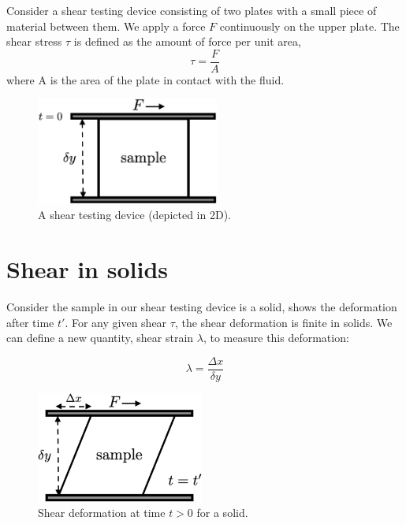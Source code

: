 Consider a shear testing device consisting of two plates with a small piece of material between them. We apply a force $F$ continuously on the upper plate. The shear stress $\tau$ is defined as the amount of force per unit area,
\begin{equation}
  \tau = \frac{F}{A}
\end{equation}
where A is the area of the plate in contact with the fluid.

\begin{figure}[h] \label{fig:shear-testing}
  \centering
  \includegraphics[width=6cm]{fig/shear-testing.png}
  \caption{A shear testing device (depicted in 2D).}
\end{figure}


\section{Shear in solids}

Consider the sample in our shear testing device is a solid,  shows the deformation after time $t'$. For any given shear $\tau$, the shear deformation is finite in solids. We can define a new quantity, shear strain $\lambda$, to measure this deformation:

\begin{equation} \label{eq:shear-strain-defn}
  \lambda = \frac{ \Delta x }{ \delta y }
\end{equation}

\begin{figure} \label{fig:shear-solids}
  \centering
  \includegraphics[width=5.5cm]{fig/shear-solid.png}
  \caption{Shear deformation at time $t>0$ for a solid.}
\end{figure}

